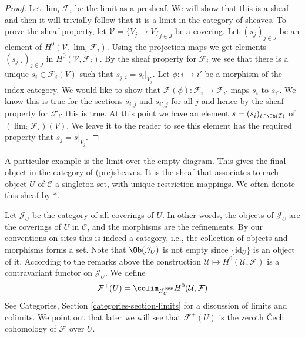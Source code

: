\begin{proof}
Let $\lim_i \mathcal{F}_i$ be the limit as a presheaf.
We will show that this is a sheaf and then it will trivially follow
that it is a limit in the category of sheaves. To prove the sheaf
property, let $\mathcal{V} = \{V_j \to V\}_{j\in J}$ be a covering.
Let $(s_j)_{j\in J}$ be an element of $H^0(\mathcal{V}, \lim_i \mathcal{F}_i)$.
Using the projection maps we get elements $(s_{j, i})_{j\in J}$
in $H^0(\mathcal{V}, \mathcal{F}_i)$. By the sheaf property for
$\mathcal{F}_i$ we see that there is a unique $s_i \in \mathcal{F}_i(V)$
such that $s_{j, i} = s_i|_{V_j}$. Let $\phi : i \to i'$ be a morphism
of the index category. We would like to show that
$\mathcal{F}(\phi) : \mathcal{F}_i \to \mathcal{F}_{i'}$
maps $s_i$ to $s_{i'}$. We know this is true for the sections
$s_{i, j}$ and $s_{i', j}$ for all $j$ and hence by the sheaf property
for $\mathcal{F}_{i'}$ this is true. At this point we have an
element $s = (s_i)_{i \in \Ob(\mathcal{I})}$ of
$(\lim_i \mathcal{F}_i)(V)$. We leave it to the reader to see
this element has the required property that $s_j = s|_{V_j}$.
\end{proof}

\begin{example}
\label{example-singleton-sheaf}
A particular example is the limit over the empty diagram.
This gives the final object in the category of (pre)sheaves.
It is the sheaf that associates to each object $U$ of $\mathcal{C}$
a singleton set, with unique restriction mappings. We often denote
this sheaf by $*$.
\end{example}

\noindent
Let $\mathcal{J}_U$ be the category of all coverings of $U$.
In other words, the objects of $\mathcal{J}_U$ are the coverings
of $U$ in $\mathcal{C}$, and the morphisms are the refinements.
By our conventions on sites this is indeed a category, i.e.,
the collection of objects and morphisms forms a set.
Note that $\Ob(\mathcal{J}_U)$ is not empty since
$\{\text{id}_U\}$ is an object of it. According to the remarks
above the construction $\mathcal{U} \mapsto H^0(\mathcal{U}, \mathcal{F})$
is a contravariant functor on $\mathcal{J}_U$.
We define
$$
\mathcal{F}^{+}(U)
=
\colim_{\mathcal{J}_U^{opp}}
H^0(\mathcal{U}, \mathcal{F})
$$
See Categories, Section \ref{categories-section-limits} for
a discussion of limits and colimits. We point out that later
we will see that $\mathcal{F}^{+}(U)$ is the zeroth {\v C}ech
cohomology of $\mathcal{F}$ over $U$.

